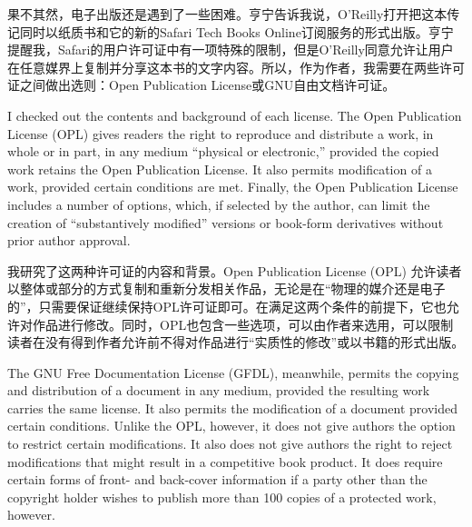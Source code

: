 \ifdefined\chs
果不其然，电子出版还是遇到了一些困难。亨宁告诉我说，O'Reilly打开把这本传记同时以纸质书和它的新的Safari Tech Books Online订阅服务的形式出版。亨宁提醒我，Safari的用户许可证中有一项特殊的限制，但是O'Reilly同意允许让用户在任意媒界上复制并分享这本书的文字内容。所以，作为作者，我需要在两些许可证之间做出选则：Open Publication License或GNU自由文档许可证。
\fi

\ifdefined\eng
I checked out the contents and background of each license. The Open Publication License (OPL) gives readers the right to reproduce and distribute a work, in whole or in part, in any medium ``physical or electronic,'' provided the copied work retains the Open Publication License. It also permits modification of a work, provided certain conditions are met. Finally, the Open Publication License includes a number of options, which, if selected by the author, can limit the creation of ``substantively modified'' versions or book-form derivatives without prior author approval.
\fi

\ifdefined\chs
我研究了这两种许可证的内容和背景。Open Publication License (OPL) 允许读者以整体或部分的方式复制和重新分发相关作品，无论是在“物理的媒介还是电子的”，只需要保证继续保持OPL许可证即可。在满足这两个条件的前提下，它也允许对作品进行修改。同时，OPL也包含一些选项，可以由作者来选用，可以限制读者在没有得到作者允许前不得对作品进行“实质性的修改”或以书籍的形式出版。
\fi

\ifdefined\eng
The GNU Free Documentation License (GFDL), meanwhile, permits the copying and distribution of a document in any medium, provided the resulting work carries the same license. It also permits the modification of a document provided certain conditions. Unlike the OPL, however, it does not give authors the option to restrict certain modifications. It also does not give authors the right to reject modifications that might result in a competitive book product. It does require certain forms of front- and back-cover information if a party other than the copyright holder wishes to publish more than 100 copies of a protected work, however.
\fi

